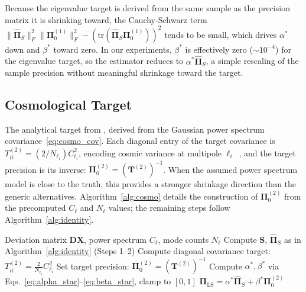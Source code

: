 Because the eigenvalue target is derived from the same sample as the precision matrix it is shrinking toward, the Cauchy-Schwarz term $\|\hat{\boldsymbol{\Pi}}_S\|_F^2 \|\boldsymbol{\Pi}_0^{(1)}\|_F^2 - (\text{tr}(\hat{\boldsymbol{\Pi}}_S \boldsymbol{\Pi}_0^{(1)}))^2$ tends to be small, which drives $\alpha^*$ down and $\beta^*$ toward zero. In our experiments, $\beta^*$ is effectively zero ($\sim 10^{-4}$) for the eigenvalue target, so the estimator reduces to $\alpha^* \hat{\boldsymbol{\Pi}}_S$, a simple rescaling of the sample precision without meaningful shrinkage toward the target.

\subsection{Cosmological Target}
\label{sec:cosmo_target}

The analytical target from \citep{looijmans2024comparison}, derived from the Gaussian power spectrum covariance~\eqref{eq:cosmo_cov}. Each diagonal entry of the target covariance is $T^{(2)}_{ii} = (2/N_{\ell_i}) C_{\ell_i}^2$, encoding cosmic variance at multipole $\ell_i$~\citep{hamilton2006measuring}, and the target precision is its inverse: $\boldsymbol{\Pi}_0^{(2)} = (\mathbf{T}^{(2)})^{-1}$. When the assumed power spectrum model is close to the truth, this provides a stronger shrinkage direction than the generic alternatives. Algorithm~\ref{alg:cosmo} details the construction of $\boldsymbol{\Pi}_0^{(2)}$ from the precomputed $C_\ell$ and $N_\ell$ values; the remaining steps follow Algorithm~\ref{alg:identity}.

\begin{algorithm}[t]
\caption{Direct Precision Shrinkage (Cosmological Target)}
\label{alg:cosmo}
\begin{algorithmic}[1]
\REQUIRE Deviation matrix $\mathbf{DX}$, power spectrum $C_\ell$, mode counts $N_\ell$
\STATE Compute $\mathbf{S}$, $\hat{\boldsymbol{\Pi}}_S$ as in Algorithm~\ref{alg:identity} (Steps 1--2)
    \STATE Compute diagonal covariance target: $T^{(2)}_{ii} = \frac{2}{N_{\ell_i}} C_{\ell_i}^2$
\ENDFOR
\STATE Set target precision: $\boldsymbol{\Pi}_0^{(2)} = (\mathbf{T}^{(2)})^{-1}$
\STATE Compute $\alpha^*, \beta^*$ via Eqs.~\eqref{eq:alpha_star}--\eqref{eq:beta_star}, clamp to $[0,1]$
\RETURN $\boldsymbol{\Pi}_{\text{LS}} = \alpha^* \hat{\boldsymbol{\Pi}}_S + \beta^* \boldsymbol{\Pi}_0^{(2)}$
\end{algorithmic}
\end{algorithm}

